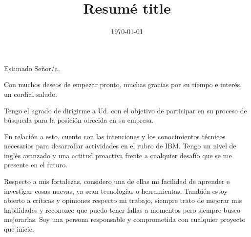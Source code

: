 \documentclass[11pt,letterpaper,roman]{moderncv}        %
\title{Resumé title}                               %
\begin{document}
\date{\today}
\opening{Estimado Señor/a,}
\closing{Con muchos deseos de empezar pronto, muchas gracias por su tiempo e interés, un cordial saludo.}
\makelettertitle

Tengo el agrado de dirigirme a Ud. con el objetivo de participar en su proceso de búsqueda para la posición ofrecida en su empresa.

En relación a esto, cuento con las intenciones y los conocimientos técnicos necesarios para desarrollar actividades en el rubro de IBM.
Tengo un nivel de inglés avanzado y una actitud proactiva frente a cualquier desafío que se me presente en el futuro.

Respecto a mis fortalezas, considero una de ellas mi facilidad de aprender e investigar cosas nuevas, ya sean tecnologías o herramientas. También estoy abierto a críticas y opiniones respecto mi trabajo, siempre trato de mejorar mis habilidades y reconozco que puedo tener fallas a momentos pero siempre busco mejorarlas. Soy una persona responsable y comprometida con cualquier proyecto que inicie.




\vspace{0.5cm}


\makeletterclosing
\end{document}
